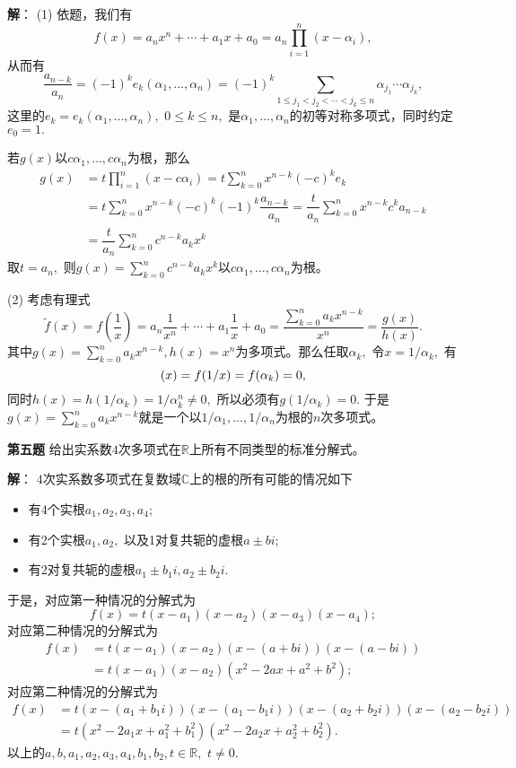 \newpageorvspace

{\bf 解}： (1) 依题，我们有
$$f(x) = a_n x^n + \cdots + a_1 x + a_0 = a_n \prod\limits_{i=1}^n (x - \alpha_i),$$
从而有
$$
\dfrac{a_{n-k}}{a_n} = (-1)^k e_k(\alpha_1, \ldots, \alpha_n) = (-1)^k \sum\limits_{1 \leqslant j_{1} < j_{2} < \cdots < j_{k} \leqslant n} \alpha_{j_{1}} \dotsm \alpha_{j_{k}},
$$
这里的$e_k = e_k(\alpha_1, \ldots, \alpha_n),$ $0\leqslant k \leqslant n,$ 是$\alpha_1, \ldots, \alpha_n$的初等对称多项式，同时约定$e_0 = 1.$

若$g(x)$以$c\alpha_1, \ldots, c\alpha_n$为根，那么
\begin{align*}
g(x) & = t \prod\limits_{i=1}^n (x - c\alpha_i) = t \sum\limits_{k=0}^n x^{n-k} (-c)^k e_k \\
& = t \sum\limits_{k=0}^n x^{n-k} (-c)^k (-1)^k \dfrac{a_{n-k}}{a_n} = \dfrac{t}{a_n} \sum\limits_{k=0}^n x^{n-k} c^k a_{n-k} \\
& = \dfrac{t}{a_n} \sum\limits_{k=0}^n c^{n-k} a_k x^k
\end{align*}
取$t = a_n,$ 则$g(x) = \sum\limits_{k=0}^n c^{n-k} a_k x^k$以$c\alpha_1, \ldots, c\alpha_n$为根。

(2) 考虑有理式
$$\tilde{f}(x) = f \left( \dfrac{1}{x} \right) = a_n \dfrac{1}{x^n} + \cdots + a_1 \dfrac{1}{x} + a_0 = \dfrac{\sum\limits_{k=0}^n a_k x^{n-k}}{x^n} = \dfrac{g(x)}{h(x)}.$$
其中$g(x) = \sum\limits_{k=0}^n a_k x^{n-k}, h(x) = x^n$为多项式。那么任取$\alpha_k,$ 令$x = 1/\alpha_k,$ 有
$$\title{f}(x) = f(1/x) = f(\alpha_k) = 0,$$
同时$h(x) = h(1/\alpha_k) = 1/\alpha_k^n \neq 0,$ 所以必须有$g(1/\alpha_k) = 0.$ 于是$g(x) = \sum\limits_{k=0}^n a_k x^{n-k}$就是一个以$1/\alpha_1, \ldots, 1/\alpha_n$为根的$n$次多项式。

\fi  %

\newpageorvspace

{\bf 第五题} 给出实系数$4$次多项式在$\mathbb{R}$上所有不同类型的标准分解式。

\ifIncludeAnswer

\newpageorvspace

{\bf 解}： $4$次实系数多项式在复数域$\mathbb{C}$上的根的所有可能的情况如下
\begin{itemize}
\item 有4个实根$a_1, a_2, a_3, a_4;$
\item 有2个实根$a_1, a_2,$ 以及1对复共轭的虚根$a \pm bi;$
\item 有2对复共轭的虚根$a_1 \pm b_1i, a_2 \pm b_2i.$
\end{itemize}
于是，对应第一种情况的分解式为
$$f(x) = t(x-a_1)(x-a_2)(x-a_3)(x-a_4);$$
对应第二种情况的分解式为
\begin{align*}
f(x) & = t(x-a_1)(x-a_2)(x-(a + bi))(x-(a - bi)) \\
& = t(x-a_1)(x-a_2)(x^2-2ax+a^2+b^2);
\end{align*}
对应第二种情况的分解式为
\begin{align*}
f(x) & = t(x-(a_1 + b_1i))(x-(a_1 - b_1i))(x-(a_2 + b_2i))(x-(a_2 - b_2i)) \\
& = t(x^2-2a_1x+a_1^2+b_1^2)(x^2-2a_2x+a_2^2+b_2^2).
\end{align*}
以上的$a, b, a_1, a_2, a_3, a_4, b_1, b_2, t \in \mathbb{R},$ $t \neq 0.$

